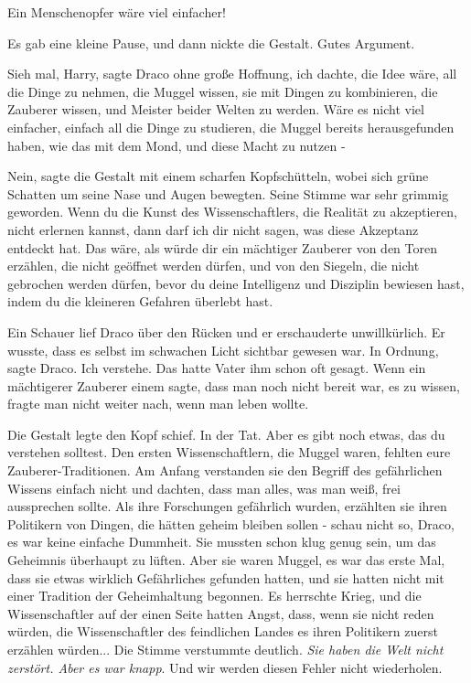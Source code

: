 \glqq{}Ein Menschenopfer wäre viel einfacher!\grqq{}

Es gab eine kleine Pause, und dann nickte die Gestalt. \glqq{}Gutes
Argument.\grqq{}

\glqq{}Sieh mal, Harry\grqq{}, sagte Draco ohne große Hoffnung, \glqq{}ich dachte,
die Idee wäre, all die Dinge zu nehmen, die Muggel wissen, sie mit Dingen zu
kombinieren, die Zauberer wissen, und Meister beider Welten zu werden. Wäre es
nicht viel einfacher, einfach all die Dinge zu studieren, die Muggel bereits
herausgefunden haben, wie das mit dem Mond, und diese Macht zu nutzen -\grqq{}

\glqq{}Nein\grqq{}, sagte die Gestalt mit einem scharfen Kopfschütteln, wobei
sich grüne Schatten um seine Nase und Augen bewegten. Seine Stimme war sehr
grimmig geworden. \glqq{}Wenn du die Kunst des Wissenschaftlers, die Realität zu
akzeptieren, nicht erlernen kannst, dann darf ich dir nicht sagen, was diese
Akzeptanz entdeckt hat. Das wäre, als würde dir ein mächtiger Zauberer von den
Toren erzählen, die nicht geöffnet werden dürfen, und von den Siegeln, die nicht
gebrochen werden dürfen, bevor du deine Intelligenz und Disziplin bewiesen hast,
indem du die kleineren Gefahren überlebt hast.\grqq{}

Ein Schauer lief Draco über den Rücken und er erschauderte unwillkürlich. Er
wusste, dass es selbst im schwachen Licht sichtbar gewesen war. \glqq{}In
Ordnung\grqq{}, sagte Draco. \glqq{}Ich verstehe.\grqq{} Das hatte Vater ihm
schon oft gesagt. Wenn ein mächtigerer Zauberer einem sagte, dass man noch nicht
bereit war, es zu wissen, fragte man nicht weiter nach, wenn man leben wollte.

Die Gestalt legte den Kopf schief. \glqq{}In der Tat. Aber es gibt noch etwas,
das du verstehen solltest. Den ersten Wissenschaftlern, die Muggel waren,
fehlten eure Zauberer-Traditionen. Am Anfang verstanden sie den Begriff des
gefährlichen Wissens einfach nicht und dachten, dass man alles, was man weiß,
frei aussprechen sollte. Als ihre Forschungen gefährlich wurden, erzählten sie
ihren Politikern von Dingen, die hätten geheim bleiben sollen - schau nicht so,
Draco, es war keine einfache Dummheit. Sie mussten schon klug genug sein, um das
Geheimnis überhaupt zu lüften. Aber sie waren Muggel, es war das erste Mal, dass
sie etwas wirklich Gefährliches gefunden hatten, und sie hatten nicht mit einer
Tradition der Geheimhaltung begonnen. Es herrschte Krieg, und die
Wissenschaftler auf der einen Seite hatten Angst, dass, wenn sie nicht reden
würden, die Wissenschaftler des feindlichen Landes es ihren Politikern zuerst
erzählen würden...\grqq{} Die Stimme verstummte deutlich. \glqq{}\emph{Sie haben
die Welt nicht zerstört. Aber es war knapp}. Und wir werden diesen Fehler nicht
wiederholen.\grqq{}

